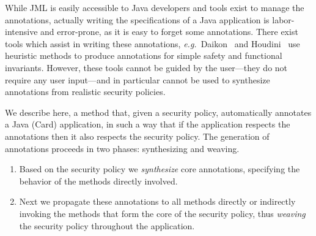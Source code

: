 
While JML is easily accessible to Java developers and tools exist
to manage the annotations, actually writing
the specifications of a Java application is labor-intensive and
error-prone, as it is easy to forget some annotations. There
exist tools which assist in writing these annotations,
\emph{e.g.}~Daikon~\cite{ErnstCGN2001:TSE} and Houdini~\cite{FlanaganL01}
use heuristic methods to produce annotations for simple safety and
functional invariants.  However, these tools cannot be guided by the
user---they do not require any user input---and in particular cannot
be used to synthesize annotations from realistic security policies.

We describe here, a method that, given a security policy,
automatically annotates a Java (Card) application, in such a way that
if the application respects the annotations then it also respects the
security policy. The generation of annotations proceeds in two phases:
synthesizing and weaving.
\begin{enumerate}
\item Based on the security policy we \emph{synthesize} core annotations, 
specifying the behavior of the methods directly involved.
\item Next we propagate these annotations to all methods directly or
indirectly invoking the methods that form the core of the security
policy, thus \emph{weaving} the security policy throughout the
application. 
\end{enumerate} 







